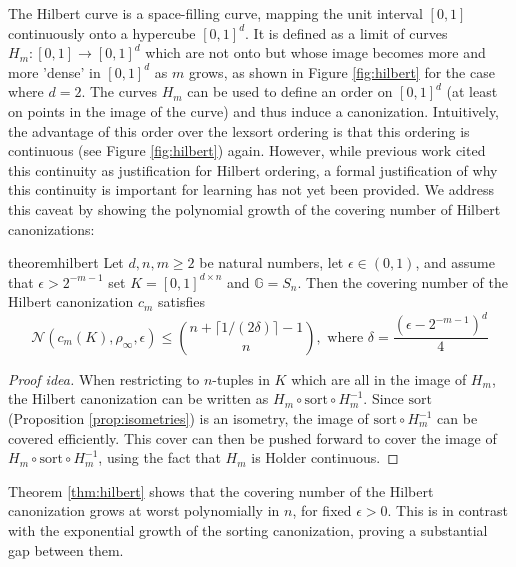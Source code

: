 \documentclass{article}
\theoremstyle{definition}
\theoremstyle{plain}
\newcommand{\G}{\mathbb{G}}
\newcommand{\N}{\mathcal{N}}
\begin{document}
The Hilbert curve is a space-filling curve, mapping the unit interval $[0,1]$ continuously onto a hypercube $[0,1]^d $. It is defined as a limit of curves $H_m:[0,1]\to [0,1]^d $ which are not onto but whose image becomes more and more 'dense' in $[0,1]^d $ as $m$ grows, as shown in Figure \ref{fig:hilbert} for the case where $d=2$. The curves $H_m$ can be used to define an order on $[0,1]^d$ (at least on points in the image of the curve) and thus induce a canonization.  Intuitively, the advantage of this order over the lexsort ordering is that this ordering is continuous (see Figure \ref{fig:hilbert}) again. However, while previous work \cite{wu2024ptv3,hilbertnet} cited this continuity as justification for  Hilbert ordering, a formal justification of why this continuity is important for learning has not yet been provided. We address this caveat by showing the polynomial growth of the covering number of Hilbert canonizations:
\begin{restatable}{theorem}{hilbert}\label{thm:hilbert}
Let $d,n,m\geq 2$ be natural numbers, let $\epsilon\in (0,1)$, and assume that $\epsilon>2^{-m-1} $ set $ K=[0,1]^{d\times n}$ and $\G=S_n$.    Then the covering number of the Hilbert canonization $c_m$ satisfies 
$$\N(c_m(K),\rho_\infty,\epsilon)\leq  \binom{n+\lceil 1/ (2\delta) \rceil-1}{n},   \text{ where } \delta= \frac{\left(\epsilon-2^{-m-1}\right)^d}{4}$$
\end{restatable}
\begin{proof}[Proof idea]
When restricting to $n$-tuples in $K$ which are all in the image of $H_m$, the Hilbert canonization can be written as $H_m \circ \mathrm{sort} \circ H_m^{-1} $. Since $\mathrm{sort}$ (Proposition \ref{prop:isometries}) is an isometry, the image of $  \mathrm{sort} \circ H_m^{-1}$  can be covered efficiently. This cover can then be pushed forward to cover the image of   $H_m\circ \mathrm{sort} \circ H_m^{-1}$, using the fact that $H_m$ is Holder continuous.
\end{proof}

 Theorem \ref{thm:hilbert} shows that the covering number of the Hilbert canonization grows at worst polynomially in $n$, for fixed $\epsilon>0$. This is in contrast with the exponential growth of the sorting canonization, proving a substantial gap between them. 
\end{document}
